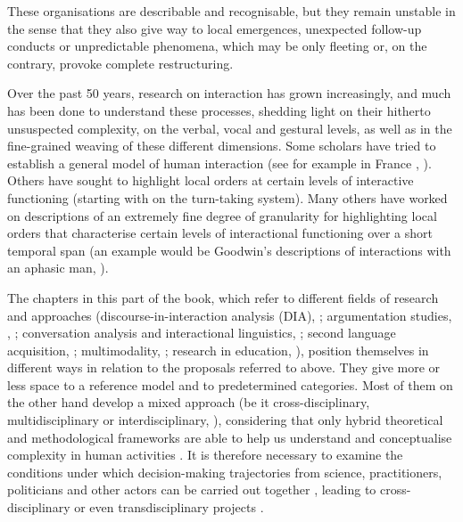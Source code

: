 \documentclass[output=paper]{langscibook}
\begin{document}
These organisations are describable and recognisable, but they remain unstable in the sense that they also give way to local emergences, unexpected follow-up conducts or unpredictable phenomena, which may be only fleeting or, on the contrary, provoke complete restructuring.

Over the past 50 years, research on interaction has grown increasingly, and much has been done to understand these processes, shedding light on their hitherto unsuspected complexity, on the verbal, vocal and gestural levels, as well as in the fine-grained weaving of these different dimensions. Some scholars have tried to establish a general model of human interaction (see for example in France \citealt{Roulet1991}, \citealt{Trognon2003}). Others have sought to highlight local orders at certain levels of interactive functioning (starting with \citealt{SacksEtAl1974} on the turn-taking system). Many others have worked on descriptions of an extremely fine degree of granularity for highlighting local orders that characterise certain levels of interactional functioning over a short temporal span (an example would be Goodwin’s descriptions of interactions with an aphasic man, \citealt{Goodwin2018, Goodwin2003}).

\begin{sloppypar}
The chapters in this part of the book, which refer to different fields of research and approaches (discourse-in-interaction analysis (DIA), \citealt{Kerbrat-Orecchioni2005}; argumentation studies, \citealt{Plantin2016}, \citealt{Doury2016}; conversation analysis and interactional linguistics, \citealt{SidnellStivers2012,Traverso2016}; second language acquisition, \citealt{CoyleEtAl2010,EllisLarsenFreeman2009}; multimodality, \citealt{StreeckEtAl2011,Mondada2014Corps}; research in education, \citealt{Kress2001}), position themselves in different ways in relation to the proposals referred to above. They give more or less space to a reference model and to predetermined categories. Most of them on the other hand develop a mixed approach (be it cross-disciplinary, multidisciplinary or interdisciplinary, \citealt{Falk-Krzesinski2016,Narcy-Combes2018}), considering that only hybrid theoretical and methodological frameworks are able to help us understand and conceptualise complexity in human activities \citep{SuthersEtAl2013}. It is therefore necessary to examine the conditions under which decision-making trajectories from science, practitioners, politicians and other actors can be carried out together \citep{Scholz2017}, leading to cross-disciplinary or even transdisciplinary projects \citep{Mazur-PalandreEtAl2019}.
\end{sloppypar}
\end{document}
